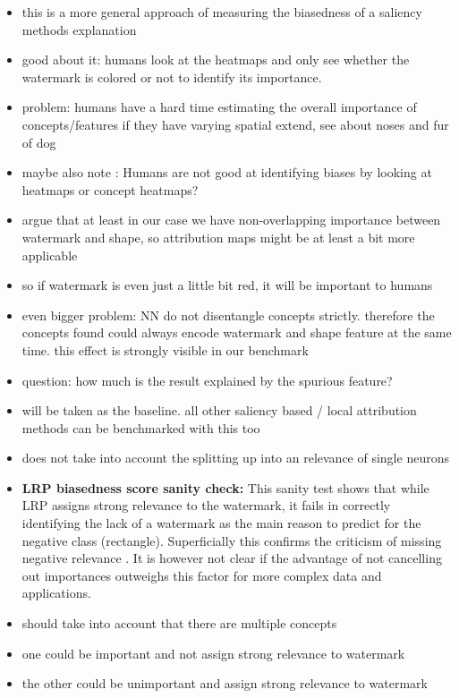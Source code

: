 \begin{itemize}
    \item this is a more general approach of measuring the biasedness of a saliency methods explanation
    \item good about it: humans look at the heatmaps and only see whether the watermark is colored or not to identify its importance.
    \item problem: humans have a hard time estimating the overall importance of concepts/features if they have varying spatial extend, see \cite{Achtibat2022} about noses and fur of dog
    \item maybe also note \cite{Sixt2022a}: Humans are not good at identifying biases by looking at heatmaps or concept heatmaps?
    \item argue that at least in our case we have non-overlapping importance between watermark and shape, so attribution maps might be at least a bit more applicable 
    \item so if watermark is even just a little bit red, it will be important to humans
    \item even bigger problem: NN do not disentangle concepts strictly. therefore the concepts found could always encode watermark and shape feature at the same time. this effect is strongly visible in our benchmark
    \item question: how much is the result explained by the spurious feature?
    \item will be taken as the baseline. all other saliency based / local attribution methods can be benchmarked with this too
    \item does not take into account the splitting up into an relevance of single neurons
    \item \textbf{LRP biasedness score sanity check:}
          This sanity test shows that while LRP assigns strong relevance to the watermark, it fails in correctly identifying the lack of a watermark as the main reason to predict for the negative class (rectangle). Superficially this confirms the criticism of missing negative relevance \cite{Sixt2020}. It is however not clear if the advantage of not cancelling out importances outweighs this factor for more complex data and applications.  
    \item should take into account that there are multiple concepts
    \item one could be important and not assign strong relevance to watermark
    \item the other could be unimportant and assign strong relevance to watermark

\end{itemize}

